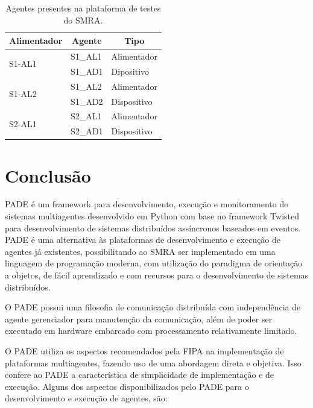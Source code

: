 \documentclass[journal]{IEEEtran}
\begin{document}
\begin{table}[htb]
    \centering
    \caption{\label{tab:agentes} Agentes presentes na plataforma de testes do SMRA.}
    \begin{tabular}{p{0.8in}p{0.5in}p{1.0in}}
        \toprule
         \multicolumn{1}{c}{Alimentador} & \multicolumn{1}{c}{Agente} & \multicolumn{1}{c}{Tipo} \\[0.1in]
        \midrule
        \midrule
        \multirow{2}{1.0in}{S1-AL1} & S1\_AL1 & Alimentador \\
        & S1\_AD1 & Dipositivo \\
        \midrule
        \multirow{2}{1.0in}{S1-AL2} & S1\_AL2 & Alimentador \\
        & S1\_AD2 & Dispositivo \\
        \midrule
        \multirow{2}{1.0in}{S2-AL1} & S2\_AL1 & Alimentador \\
        & S2\_AD1 & Dispositivo \\
        \bottomrule
    \end{tabular}
\end{table}

\section{Conclusão}

PADE é um framework para desenvolvimento, execução e monitoramento de sistemas multiagentes desenvolvido em Python com base no framework Twisted para desenvolvimento de sistemas distribuídos assíncronos baseados em eventos. PADE é uma alternativa às plataformas de desenvolvimento e execução de agentes já existentes, possibilitando ao SMRA ser implementado em uma linguagem de programação moderna, com utilização do paradigma de orientação a objetos, de fácil aprendizado e com recursos para o desenvolvimento de sistemas distribuídos.

O PADE possui uma filosofia de comunicação distribuída com independência de agente gerenciador para manutenção da comunicação, além de poder ser executado em hardware embarcado com processamento relativamente limitado.

O PADE utiliza os aspectos recomendados pela FIPA na implementação de plataformas multiagentes, fazendo uso de uma abordagem direta e objetiva. Isso confere ao PADE a característica de simplicidade de implementação e de execução. Alguns dos aspectos disponibilizados pelo PADE para o desenvolvimento e execução de agentes, são:
\end{document}
